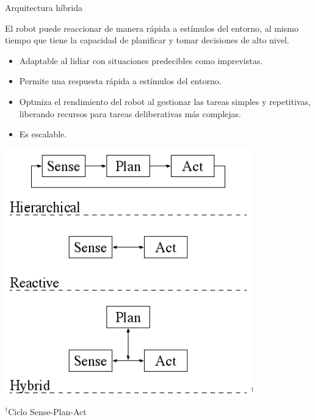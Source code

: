 \documentclass[
  24pt, %
  aspectratio=169, %
]{beamer}
\begin{document}
\begin{frame}{Arquitectura híbrida}
  \begin{minipage}{0.47\textwidth}
    
    \small El robot puede reaccionar de manera rápida a estímulos del entorno, al mismo tiempo que tiene la capacidad de planificar y tomar decisiones de alto nivel.
    
    \begin{itemize}
    \item Adaptable al lidiar con situaciones predecibles como imprevistas.
    \item Permite una respuesta rápida a estímulos del entorno.
    \item Optmiza el rendimiento del robot al gestionar las tareas simples y repetitivas, liberando recursos para tareas deliberativas más complejas.
    \item Es escalable.
    \end{itemize}
  \end{minipage}
  \hspace{0.2cm}
  \begin{minipage}{0.5\textwidth}
    \includegraphics[width=0.8\textwidth]{architecture.png}$^\dag$\\
    \rule{0in}{1.2em}$^\dag$\scriptsize Ciclo Sense-Plan-Act \\
    \tiny \cite{murphy2000} %
  \end{minipage}
\end{frame}
\end{document}

